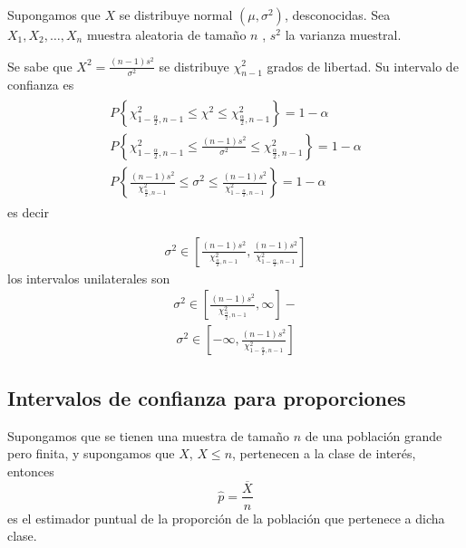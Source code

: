 Supongamos que  $X$ se distribuye normal $\left(\mu,\sigma^{2}\right)$, desconocidas. Sea $X_{1},X_{2},\ldots,X_{n}$ muestra aleatoria de tama\~no $n$ , $s^{2}$ la varianza muestral.

Se sabe que $X^{2}=\frac{\left(n-1\right)s^{2}}{\sigma^{2}}$ se distribuye $\chi^{2}_{n-1}$ grados de libertad. Su intervalo de confianza es
\begin{eqnarray}
\begin{array}{l}
P\left\{\chi^{2}_{1-\frac{\alpha}{2},n-1}\leq\chi^{2}\leq\chi^{2}_{\frac{\alpha}{2},n-1}\right\}=1-\alpha\\
P\left\{\chi^{2}_{1-\frac{\alpha}{2},n-1}\leq\frac{\left(n-1\right)s^{2}}{\sigma^{2}}\leq\chi^{2}_{\frac{\alpha}{2},n-1}\right\}=1-\alpha\\
P\left\{\frac{\left(n-1\right)s^{2}}{\chi^{2}_{\frac{\alpha}{2},n-1}}\leq\sigma^{2}\leq\frac{\left(n-1\right)s^{2}}{\chi^{2}_{1-\frac{\alpha}{2},n-1}}\right\}=1-\alpha
\end{array}
\end{eqnarray}
es decir








\begin{eqnarray}
\sigma^{2}\in\left[\frac{\left(n-1\right)s^{2}}{\chi^{2}_{\frac{\alpha}{2},n-1}},\frac{\left(n-1\right)s^{2}}{\chi^{2}_{1-\frac{\alpha}{2},n-1}}\right]
\end{eqnarray}
los intervalos unilaterales son
\begin{eqnarray}
\sigma^{2}\in\left[\frac{\left(n-1\right)s^{2}}{\chi^{2}_{\frac{\alpha}{2},n-1}},\infty\right]-
\end{eqnarray}
\begin{eqnarray}
\sigma^{2}\in\left[-\infty,\frac{\left(n-1\right)s^{2}}{\chi^{2}_{1-\frac{\alpha}{2},n-1}}\right]
\end{eqnarray}




\subsection*{Intervalos de confianza para proporciones}




Supongamos que se tienen una muestra de tama\~no $n$ de una poblaci\'on grande pero finita, y supongamos que $X$, $X\leq n$, pertenecen a la clase de inter\'es, entonces $$\hat{p}=\frac{\overline{X}}{n}$$ es el estimador puntual de la proporci\'on de la poblaci\'on que pertenece a dicha clase.


